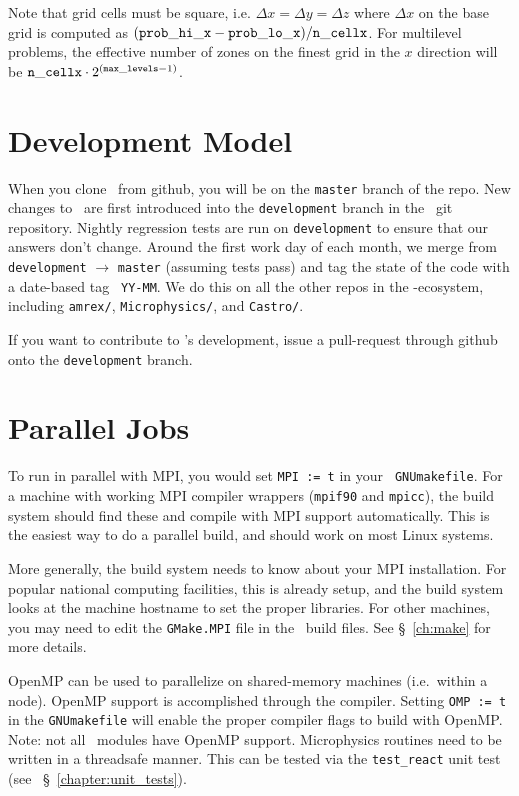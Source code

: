 Note that grid cells must be square, i.e. $\Delta x = \Delta y = \Delta z$
where $\Delta x$ on the base grid is computed as $({\tt prob\_hi\_x}
- {\tt prob\_lo\_x})/{\tt n\_cellx}$.  For multilevel problems, the effective
number of zones on the finest grid in the $x$ direction will be
${\tt n\_cellx} \cdot 2^{({\tt max\_levels} -1)}$.


\section{Development Model}

When you clone \maestro\ from github, you will be on the {\tt master}
branch of the repo.  New changes to \maestro\ are first introduced
into the {\tt development} branch in the \maestro\ git repository.
Nightly regression tests are run on {\tt development} to ensure that
our answers don't change.  Around the first work day of each month, we
merge from {\tt development} $\rightarrow$ {\tt master} (assuming
tests pass) and tag the state of the code with a date-based tag {\tt
  YY-MM}.  We do this on all the other repos in the \amrex-ecosystem,
including {\tt amrex/}, {\tt Microphysics/}, and {\tt Castro/}.  

If you want to contribute to \maestro's development, issue a pull-request
through github onto the {\tt development} branch.


\section{Parallel Jobs}

To run in parallel with MPI, you would set {\tt MPI := t} in your {\tt
  GNUmakefile}.  For a machine with working MPI compiler wrappers
({\tt mpif90} and {\tt mpicc}), the build system should find these and
compile with MPI support automatically.  This is the easiest way to do
a parallel build, and should work on most Linux systems.

More generally, the build system needs to know about your MPI
installation.  For popular national computing facilities, this is
already setup, and the build system looks at the machine hostname to
set the proper libraries.  For other machines, you may need to edit
the {\tt GMake.MPI} file in the \amrex\ build files.  See
\S~\ref{ch:make} for more details.

OpenMP can be used to parallelize on shared-memory machines (i.e.\
within a node).  OpenMP support is accomplished through the compiler.
Setting {\tt OMP := t} in the {\tt GNUmakefile} will enable the proper
compiler flags to build with OpenMP.  Note: not all \maestro\ modules 
have OpenMP support.  Microphysics routines need to be written in a
threadsafe manner.  This can be tested via the {\tt test\_react} unit
test (see ~\S~\ref{chapter:unit_tests}).

